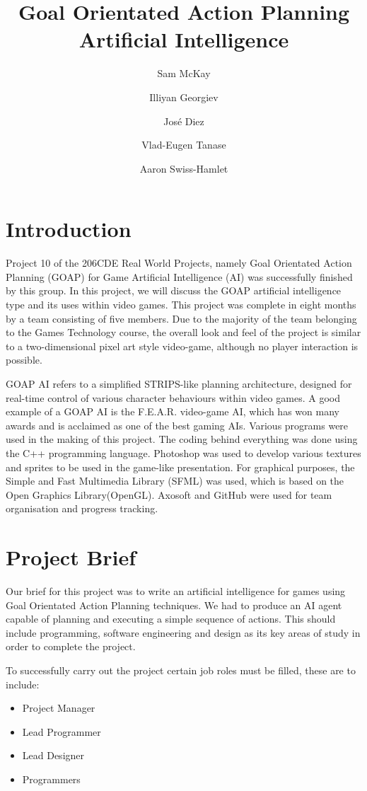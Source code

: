 \documentclass[a4paper]{report}
\begin{document}
\title{Goal Orientated Action Planning Artificial Intelligence}
\author{Sam McKay \and Illiyan Georgiev \and ‎José Diez\and Vlad-Eugen Tanase \and Aaron Swiss-Hamlet }
\maketitle
\tableofcontents
\chapter{Introduction}
Project 10 of the 206CDE Real World Projects, namely Goal Orientated Action Planning (GOAP) for Game Artificial Intelligence (AI) was successfully finished by this group. In this project, we will discuss the GOAP artificial intelligence type and its uses within video games. This project was complete in eight months by a team consisting of five members. Due to the majority of the team belonging to the Games Technology course, the overall look and feel of the project is similar to a two-dimensional pixel art style video-game, although no player interaction is possible. 
 
GOAP AI refers to a simplified STRIPS-like planning architecture, designed for real-time control of various character behaviours within video games. A good example of a GOAP AI is the F.E.A.R. video-game AI, which has won many awards and is acclaimed as one of the best gaming AIs. Various programs were used in the making of this project. The coding behind everything was done using the C++ programming language. Photoshop was used to develop various textures and sprites to be used in the game-like presentation. For graphical purposes, the Simple and Fast Multimedia Library (SFML) was used, which is based on the Open Graphics Library(OpenGL). Axosoft and GitHub were used for team organisation and progress tracking.

\chapter{Project Brief}
Our brief for this project was to write an artificial intelligence for games using Goal Orientated Action Planning techniques. We had to produce an AI agent capable of planning and executing a simple sequence of actions. This should include programming, software engineering and design as its key areas of study in order to complete the project. 

To successfully carry out the project certain job roles must be filled, these are to include:
\begin{itemize}
	\item Project Manager
	\item Lead Programmer
	\item Lead Designer
	\item Programmers
\end{itemize} 
\end{document}
